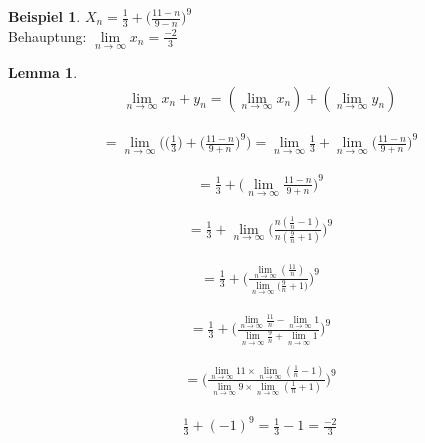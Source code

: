\documentclass[a4paper,12pt,leqno]{report}
\theoremstyle{plain} %
\newtheorem{lemma}[theorem]{Lemma}
\theoremstyle{definition} %
\newtheorem{example}[theorem]{Beispiel}
\begin{document}
\begin{example}
$X_n = \frac{1}{3} + \big(\frac{11-n}{9-n}\big)^9$\\


Behauptung: $\lim\limits_{n \rightarrow \infty}{x_n}=\frac{-2}{3}$

\begin{lemma}
\begin{gather}
\lim\limits_{n \rightarrow \infty}{x_n+y_n}=
(\lim\limits_{n \rightarrow \infty}{x_n}) +
(\lim\limits_{n \rightarrow \infty}{y_n})
\end{gather}
\end{lemma}

\begin{gather}
=\lim\limits_{n \rightarrow \infty}{\bigg(\big(\frac{1}{3}\big)+\bigg(\frac{11-n}{9+n}\bigg)^9\bigg)}
= \lim\limits_{n \rightarrow \infty}{\frac{1}{3}+
\lim\limits_{n \rightarrow \infty}{\bigg(\frac{11-n}{9+n}\bigg)^9}}
\end{gather}

\begin{gather}
= \frac{1}{3} + \bigg(\lim\limits_{n \rightarrow \infty}{\frac{11-n}{9+n}}\bigg)^9
\end{gather}


\begin{gather}
= \frac{1}{3} + \lim\limits_{n \rightarrow \infty}{\Bigg(\frac{n(\frac{1}{n}-1)}{n(\frac{9}{n}+1)}\Bigg)^9}
\end{gather}

\begin{gather}
= \frac{1}{3}+\Bigg(\frac{\lim\limits_{n \rightarrow \infty}{(\frac{11}{n})}}{\lim\limits_{n \rightarrow \infty}{(\frac{9}{n}+1})}\Bigg)^9
\end{gather}

\begin{gather}
= \frac{1}{3} + \Bigg(
\frac{\lim\limits_{n \rightarrow \infty}{\frac{11}{n}} - \lim\limits_{n \rightarrow \infty}{1}}{\lim\limits_{n \rightarrow \infty}{\frac{9}{n}+\lim\limits_{n \rightarrow \infty}{1} } }   \Bigg)^9
\end{gather}


\begin{gather}
=\Bigg(
\frac{\lim\limits_{n \rightarrow \infty}{11} \times \lim\limits_{n \rightarrow \infty}{(\frac{1}{n}-1)}}{\lim\limits_{n \rightarrow \infty}{9 \times \lim\limits_{n \rightarrow \infty}{(\frac{1}{n}+1)} } }   \Bigg)^9
\end{gather}

\begin{gather}
\frac{1}{3}+(-1)^9 = \frac{1}{3}-1 = \frac{-2}{3}
\end{gather}
\end{example}
\end{document}
